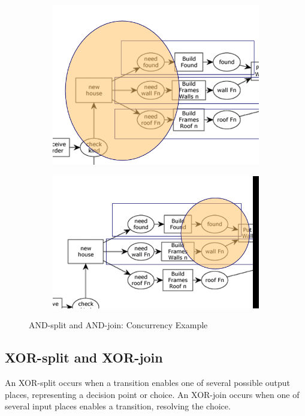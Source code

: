     \begin{figure}[htbp]
        \centering
        \begin{subfigure}{\textwidth}
            \includegraphics[scale=0.3]{capitolo 3/3-and-split.png}
        \end{subfigure}
        \begin{subfigure}{\textwidth}
            \includegraphics[scale=0.3]{capitolo 3/3-and-join.png}
        \end{subfigure}
        \caption{AND-split and AND-join: Concurrency Example}
    \end{figure}
    
    \subsection{XOR-split and XOR-join}
    An XOR-split occurs when a transition enables one of several possible output places, representing a decision point or choice. An XOR-join occurs when one of several input places enables a transition, resolving the choice.
    
